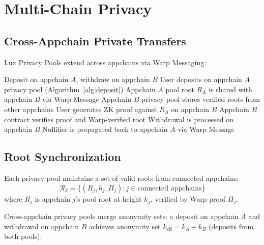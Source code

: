 \section{Multi-Chain Privacy}
\label{sec:multichain}

\subsection{Cross-Appchain Private Transfers}

Lux Privacy Pools extend across appchains via Warp Messaging:

\begin{algorithm}[H]
\caption{Cross-Appchain Private Transfer}
\label{alg:cross_private}
\begin{algorithmic}[1]
\Require Deposit on appchain $A$, withdraw on appchain $B$
\State User deposits on appchain $A$ privacy pool (Algorithm~\ref{alg:deposit})
\State Appchain $A$ pool root $R_A$ is shared with appchain $B$ via Warp Message
\State Appchain $B$ privacy pool stores verified roots from other appchains
\State User generates ZK proof against $R_A$ on appchain $B$
\State Appchain $B$ contract verifies proof and Warp-verified root
\State Withdrawal is processed on appchain $B$
\State Nullifier is propagated back to appchain $A$ via Warp Message
\end{algorithmic}
\end{algorithm}

\subsection{Root Synchronization}

\begin{definition}
Each privacy pool maintains a set of valid roots from connected appchains:
\begin{equation}
    \mathcal{R}_k = \{(R_j, h_j, \Pi_j) : j \in \text{connected appchains}\}
\end{equation}
where $R_j$ is appchain $j$'s pool root at height $h_j$, verified by Warp proof $\Pi_j$.
\end{definition}

\begin{proposition}
Cross-appchain privacy pools merge anonymity sets: a deposit on appchain $A$ and withdrawal on appchain $B$ achieves anonymity set $k_{\text{eff}} = k_A + k_B$ (deposits from both pools).
\end{proposition}

